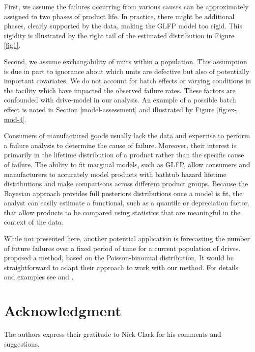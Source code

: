 \documentclass[12pt]{article}
\begin{document}
First, we assume the failures occurring from various causes can be approximately assigned to two phases of product life.  In practice, there might be additional phases, clearly supported by the data, making the GLFP model too rigid. This rigidity is illustrated by the right tail of the estimated distribution in Figure \ref{fig1}.

Second, we assume exchangability of units within a population. This assumption is due in part to ignorance about which units are defective but also of potentially important covariates. We do not account for batch effects or varying conditions in the facility which have impacted the observed failure rates. These factors are confounded with drive-model in our analysis. An example of a possible batch effect is noted in Section \ref{model-assessment} and illustrated by Figure \ref{fig:ex-mod-4}. 

Consumers of manufactured goods usually lack the data and expertise to perform a failure analysis to determine the cause of failure.  Moreover, their interest is primarily in the lifetime distribution of a product rather than the specific cause of failure.  The ability to fit marginal models, such as GLFP, allow consumers and manufacturers to accurately model products with bathtub hazard lifetime distributions and make comparisons across different product groups.  Because the Bayesian approach provides full posteriors distributions once a model is fit, the analyst can easily estimate a functional, such as a quantile or depreciation factor, that allow products to be compared using statistics that are meaningful in the context of the data. 

While not presented here, another potential application is forecasting the number of future failures over a fixed period of time for a current population of drives. \citet{hmm} proposed a method, based on the Poisson-binomial distribution. It would be straightforward to adapt their approach to work with our method. For details and examples see \citet[Sect.~6]{hmm} and \citet{xu2015assessing}.

\section*{Acknowledgment}    
The authors express their gratitude to Nick Clark for his comments and suggestions.

\clearpage
\end{document}
